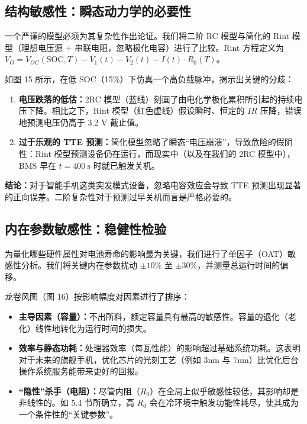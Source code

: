 \documentclass[11pt,a4paper]{ctexart}
\begin{document}
\subsection{结构敏感性：瞬态动力学的必要性}

一个严谨的模型必须为其复杂性作出论证。我们将二阶 RC 模型与简化的 Rint 模型（理想电压源 + 串联电阻，忽略极化电容）进行了比较。Rint 方程定义为 $V_O=V_{OC}(\mathrm{SOC},T)-V_1(t)-V_2(t)-I(t)\cdot R_0(T)$。

如图 15 所示，在低 SOC（15\%）下仿真一个高负载脉冲，揭示出关键的分歧：

\begin{enumerate}[leftmargin=1.8em,itemsep=0.2em]
\item \textbf{电压跌落的低估：}2RC 模型（蓝线）刻画了由电化学极化累积所引起的持续电压下降。相比之下，Rint 模型（红色虚线）假设瞬时、恒定的 $IR$ 压降，错误地预测电压仍高于 3.2 V 截止值。
\item \textbf{过于乐观的 TTE 预测：}简化模型忽略了瞬态“电压崩溃”，导致危险的假阴性：Rint 模型预测设备仍在运行，而现实中（以及在我们的 2RC 模型中），BMS 早在 $t=400\ \mathrm{s}$ 时就已触发关机。
\end{enumerate}

\textbf{结论：}对于智能手机这类突发模式设备，忽略电容效应会导致 TTE 预测出现显著的正向误差。二阶复杂性对于预测过早关机而言是严格必要的。

\subsection{内在参数敏感性：稳健性检验}

为量化哪些硬件属性对电池寿命的影响最为关键，我们进行了单因子（OAT）敏感性分析。我们将关键内在参数扰动 $\pm 10\%$ 至 $\pm 30\%$，并测量总运行时间的偏移。

龙卷风图（图 16）按影响幅度对因素进行了排序：

\begin{itemize}[leftmargin=1.6em,itemsep=0.3em]
\item \textbf{主导因素（容量）：}不出所料，额定容量具有最高的敏感性。容量的退化（老化）线性地转化为运行时间的损失。
\item \textbf{效率与静态功耗：}处理器效率（每瓦性能）的影响超过基础系统功耗。这表明对于未来的旗舰手机，优化芯片的光刻工艺（例如 3nm 与 7nm）比优化后台操作系统服务能带来更好的回报。
\item \textbf{“隐性”杀手（电阻）：}尽管内阻（$R_0$）在全局上似乎敏感性较低，其影响却是非线性的。如 5.4 节所确立，高 $R_0$ 会在冷环境中触发功能性耗尽，使其成为一个条件性的“关键参数”。
\end{itemize}
\end{document}
